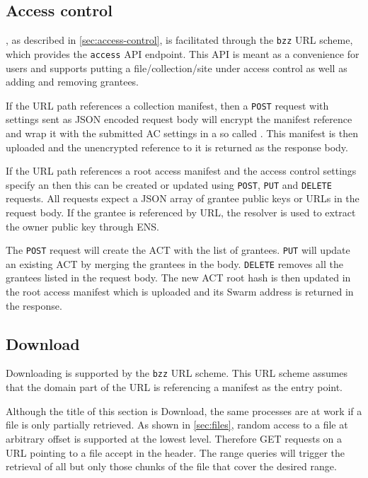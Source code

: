 \subsection{Access control \statusgreen}\label{sec:access-control-ux}

, as described in  \ref{sec:access-control}, is facilitated through  the \lstinline{bzz} URL scheme, which provides the \lstinline{access} API endpoint. This API is meant as a convenience for users and supports putting a file/collection/site under access control as well as adding and removing grantees.

If the URL path references a collection manifest, then a \lstinline{POST} request with  settings sent as JSON encoded request body will encrypt the manifest reference and wrap it with the submitted AC settings in a so called . This manifest is then uploaded and the unencrypted reference to it is returned as the response body. 

If the URL path references a root access manifest and the access control settings specify an  then this can be created or updated using \lstinline{POST}, \lstinline{PUT} and \lstinline{DELETE} requests. All requests expect a JSON array of grantee public keys or URLs in the request body. If the grantee is referenced by URL, the resolver is used to extract the owner public key through ENS.

The \lstinline{POST} request will create the ACT with the list of grantees. \lstinline{PUT} will update an existing ACT by merging the grantees in the body. \lstinline{DELETE} removes all the grantees listed in the request body. The new ACT root hash is then updated in the root access manifest which is uploaded and its Swarm address is returned in the response.



\subsection{Download \statusgreen}\label{sec:download}

Downloading is supported by the \lstinline{bzz} URL scheme. This URL scheme assumes that the domain part of the URL is referencing a manifest as the entry point. 

Although the title of this section is Download, the same  processes are at work if a file is only partially retrieved. As shown in \ref{sec:files}, random access to a file at arbitrary offset is supported at the lowest level. Therefore GET requests on a URL pointing to a file accept  in the header. The range queries will trigger the retrieval of all but only those chunks of the file that cover the desired range.  

